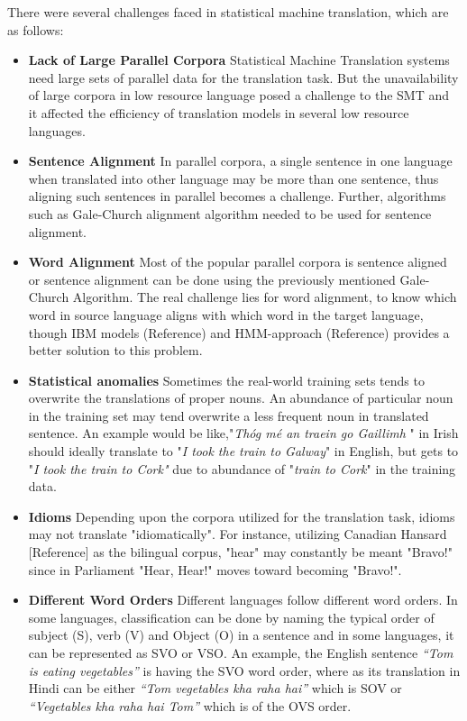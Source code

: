 There were several challenges faced in statistical machine translation, which are as follows:

\begin{itemize}
    \item \textbf{Lack of Large Parallel Corpora}   Statistical Machine Translation systems need large sets of parallel data for the translation task. But the unavailability of large corpora in low resource language posed a challenge to the SMT and it affected the efficiency of translation models in several low resource languages.
    \item\textbf{Sentence Alignment }   In parallel corpora, a single sentence in one language when translated into other language may be more than one sentence, thus aligning such sentences in parallel becomes a challenge. Further, algorithms such as Gale-Church alignment algorithm needed to be used for sentence alignment.
     \item\textbf{Word Alignment }      Most of the popular parallel corpora is sentence aligned or sentence alignment can be done using the previously mentioned Gale-Church Algorithm. The real challenge lies for word alignment, to know which word in source language aligns with which word in the target language, though IBM models (Reference) and HMM-approach (Reference) provides a better solution to this problem.
     \item\textbf{Statistical anomalies }  Sometimes the real-world training sets tends to overwrite the translations of proper nouns. An abundance of particular noun in the training set may tend overwrite a less frequent noun in translated sentence. An example would be like,"\textit{Thóg mé an traein go Gaillimh} " in Irish should ideally translate to "\textit{I took the train to Galway}" in English, but gets to "\textit{I took the train to Cork"} due to abundance of "\textit{train to Cork}" in the training data.
     \item\textbf{Idioms }Depending upon the corpora utilized for the translation task, idioms may not translate "idiomatically". For instance, utilizing Canadian Hansard [Reference] as the bilingual corpus, "hear" may constantly be meant "Bravo!" since in Parliament "Hear, Hear!" moves toward becoming "Bravo!". 
     \item\textbf{Different Word Orders}    Different languages follow different word orders. In some languages, classification can be done by naming the typical order of subject (S), verb (V) and Object (O) in a sentence and in some languages, it can be represented as SVO or VSO. An example, the English sentence \textit{“Tom is eating vegetables”} is having the SVO word order, where as its translation in Hindi can be either \textit{“Tom vegetables kha raha hai”} which is SOV or \textit{“Vegetables kha raha hai Tom”} which is of the OVS order. 

\end{itemize}
